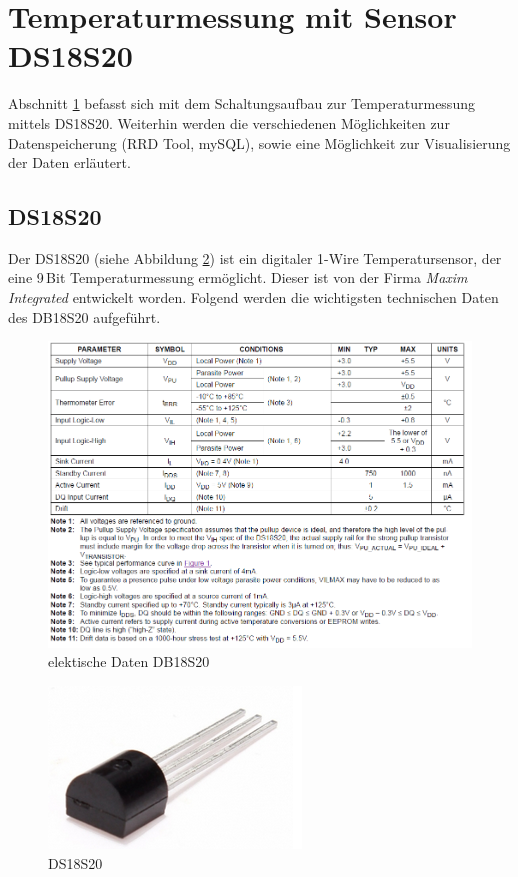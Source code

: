 \section{Temperaturmessung mit Sensor DS18S20}
\label{section_DS18S20}
Abschnitt \ref{section_DS18S20} befasst sich mit dem Schaltungsaufbau zur Temperaturmessung mittels DS18S20. Weiterhin werden die verschiedenen Möglichkeiten zur Datenspeicherung (RRD Tool, mySQL), sowie eine Möglichkeit zur Visualisierung der Daten erläutert. 
 



\subsection{DS18S20}
\label{subsection_DS18S20}
Der DS18S20 (siehe Abbildung \ref{Abb_DS18S20}) ist ein digitaler 1-Wire Temperatursensor, der eine 9\,Bit Temperaturmessung ermöglicht. Dieser ist von der Firma \textit{Maxim Integrated} entwickelt worden.
Folgend werden die wichtigsten technischen Daten des DB18S20 aufgeführt.

\begin{figure}[!h] 
  \centering
     \includegraphics[scale=.6]{BilderAllgemein/Daten_DB18S20.png}
  \caption{elektische Daten DB18S20 \citep[S. 2]{Datenblatt_DB18S20}}
  \label{Abb_elektrische_Daten_DS18S20}
\end{figure}

\begin{figure}[!h] 
  \centering
     \includegraphics[scale=.4]{BilderAllgemein/DS18S20.png}
  \caption{DS18S20 \citep{Bild_DS18S20}}
  \label{Abb_DS18S20}
\end{figure}

